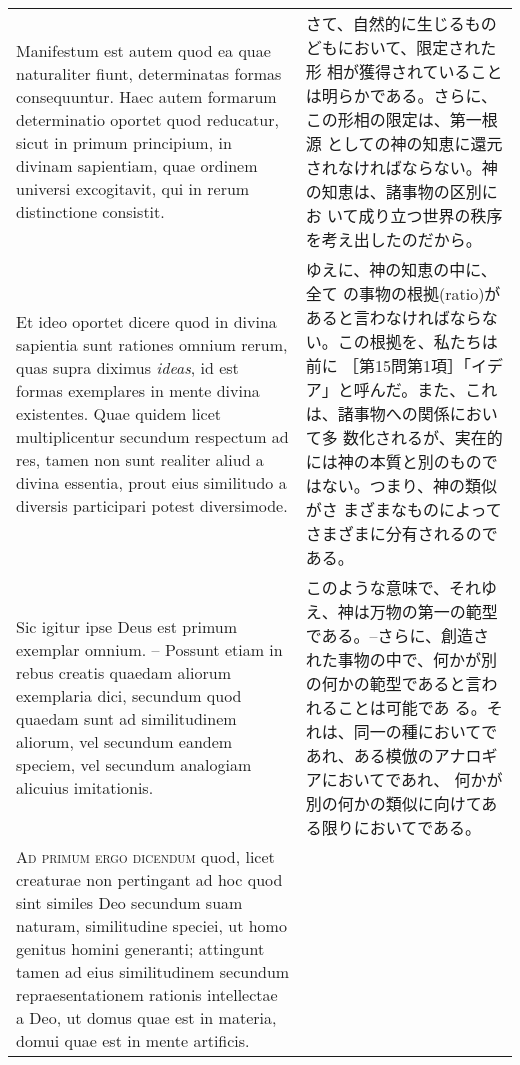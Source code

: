 \documentclass[10pt]{jsarticle} %
\begin{document}
\begin{longtable}{p{21em}p{21em}}
\\

Manifestum est autem quod ea quae naturaliter fiunt,
determinatas formas consequuntur. Haec autem formarum determinatio
oportet quod reducatur, sicut in primum principium, in divinam
sapientiam, quae ordinem universi excogitavit, qui in rerum distinctione
consistit. 

&

さて、自然的に生じるものどもにおいて、限定された形
相が獲得されていることは明らかである。さらに、この形相の限定は、第一根源
としての神の知恵に還元されなければならない。神の知恵は、諸事物の区別にお
いて成り立つ世界の秩序を考え出したのだから。

\\

Et ideo oportet dicere quod in divina sapientia sunt rationes
omnium rerum, quas supra diximus {\itshape ideas}, id est formas
exemplares in mente divina existentes. Quae quidem licet multiplicentur
secundum respectum ad res, tamen non sunt realiter aliud a divina
essentia, prout eius similitudo a diversis participari potest
diversimode. 

&

ゆえに、神の知恵の中に、全て
の事物の根拠(ratio)があると言わなければならない。この根拠を、私たちは前に
［第15問第1項］「イデア」と呼んだ。また、これは、諸事物への関係において多
数化されるが、実在的には神の本質と別のものではない。つまり、神の類似がさ
まざまなものによってさまざまに分有されるのである。

\\

Sic igitur ipse Deus est primum exemplar omnium. -- Possunt
etiam in rebus creatis quaedam aliorum exemplaria dici, secundum quod
quaedam sunt ad similitudinem aliorum, vel secundum eandem speciem, vel
secundum analogiam alicuius imitationis.


&

このような意味で、それゆえ、神は万物の第一の範型である。--さらに、創造さ
 れた事物の中で、何かが別の何かの範型であると言われることは可能であ
 る。それは、同一の種においてであれ、ある模倣のアナロギアにおいてであれ、
 何かが別の何かの類似に向けてある限りにおいてである。

\\

{\scshape Ad primum ergo dicendum} quod, licet creaturae
non pertingant ad hoc quod sint similes Deo secundum suam naturam,
similitudine speciei, ut homo genitus homini generanti; attingunt tamen
ad eius similitudinem secundum repraesentationem rationis intellectae a
Deo, ut domus quae est in materia, domui quae est in mente artificis.



\end{longtable}
\end{document}
